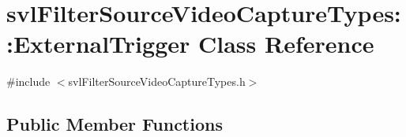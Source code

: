 \hypertarget{classsvl_filter_source_video_capture_types_1_1_external_trigger}{\section{svl\-Filter\-Source\-Video\-Capture\-Types\-:\-:External\-Trigger Class Reference}
\label{classsvl_filter_source_video_capture_types_1_1_external_trigger}
}


{\ttfamily \#include $<$svl\-Filter\-Source\-Video\-Capture\-Types.\-h$>$}

\subsection*{Public Member Functions}
